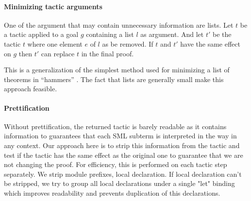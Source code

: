 \documentclass[runningheads,a4paper,draft]{svjour3}
\newcommand{\todoi}[1]{\todo[inline]{#1}}
\def\sml{\textsf{SML}\xspace}
\begin{document}
\paragraph{Minimizing tactic arguments}
One of the argument that may contain unnecessary information are lists.
Let $t$ be a tactic applied to a goal $g$ containing a list $l$ as argument. 
And let $t'$ be the tactic $t$ where one element $e$ of $l$ as be removed. If 
$t$ and $t'$ have the same effect on $g$ then $t'$ can replace $t$ in the final 
proof.

This is a generalization of the simplest method used for minimizing a list of 
theorems in ``hammers'' \cite{}. The fact that lists are generally small
make this approach feasible.

\paragraph{Prettification}
Without prettification, the returned tactic is barely readable as it contains 
information to guarantees that each \sml subterm is interpreted in the way in 
any context. Our approach here is to strip this information from the tactic and 
test if the tactic has the same effect as the original one to guarantee that we 
are not changing the proof. For efficiency, 
this is performed on each tactic step separately. We strip module prefixes, 
local declaration. If local declaration can't be 
stripped, we try to group all local declarations under a single "let" binding 
which improves readability and prevents duplication of this declarations.

\todoi{Example prettified proof}

\end{document}
